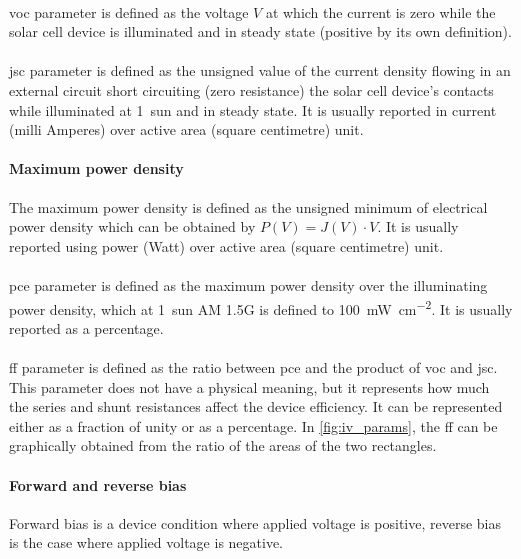 		\paragraph{}
		\Gls{voc} parameter is defined as the voltage $V$ at which the current is zero while the solar cell device is illuminated and in steady state (positive by its own definition).

		\paragraph{}
		\Gls{jsc} parameter is defined as the unsigned value of the current density flowing in an external circuit short circuiting (zero resistance) the solar cell device's contacts while illuminated at 1~sun and in steady state.
		It is usually reported in current (milli Amperes) over active area (square centimetre) unit.

		\paragraph{Maximum power density}
		The maximum power density is defined as the unsigned minimum of electrical power density which can be obtained by $P(V) = J(V) \cdot V$.
		It is usually reported using power (Watt) over active area (square centimetre) unit.

		\paragraph{}
		\Gls{pce} parameter is defined as the maximum power density over the illuminating power density, which at 1~sun AM 1.5G is defined to \SI{100}{\mW\per\square\cm}.
		It is usually reported as a percentage.

		\paragraph{}\label{characterization_ff}
		\Gls{ff} parameter is defined as the ratio between \gls{pce} and the product of \gls{voc} and \gls{jsc}.
		This parameter does not have a physical meaning, but it represents how much the series and shunt resistances affect the device efficiency.
		It can be represented either as a fraction of unity or as a percentage.
		In \cref{fig:iv_params}, the \gls{ff} can be graphically obtained from the ratio of the areas of the two rectangles.

		\paragraph{Forward and reverse bias}
		Forward bias is a device condition where applied voltage is positive, reverse bias is the case where applied voltage is negative.

